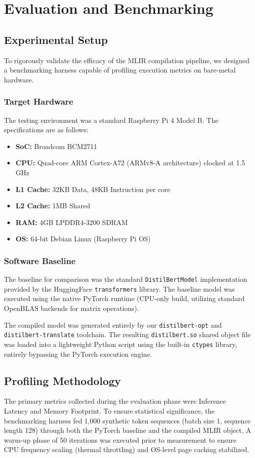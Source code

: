 \chapter{Evaluation and Benchmarking}
\label{ch:evaluation}

\section{Experimental Setup}
To rigorously validate the efficacy of the MLIR compilation pipeline, we designed a benchmarking harness capable of profiling execution metrics on bare-metal hardware. 

\subsection{Target Hardware}
The testing environment was a standard Raspberry Pi 4 Model B. The specifications are as follows:
\begin{itemize}
    \item \textbf{SoC:} Broadcom BCM2711
    \item \textbf{CPU:} Quad-core ARM Cortex-A72 (ARMv8-A architecture) clocked at 1.5 GHz
    \item \textbf{L1 Cache:} 32KB Data, 48KB Instruction per core
    \item \textbf{L2 Cache:} 1MB Shared
    \item \textbf{RAM:} 4GB LPDDR4-3200 SDRAM
    \item \textbf{OS:} 64-bit Debian Linux (Raspberry Pi OS)
\end{itemize}

\subsection{Software Baseline}
The baseline for comparison was the standard \texttt{DistilBertModel} implementation provided by the HuggingFace \texttt{transformers} library. The baseline model was executed using the native PyTorch runtime (CPU-only build, utilizing standard OpenBLAS backends for matrix operations). 

The compiled model was generated entirely by our \texttt{distilbert-opt} and \texttt{distilbert-translate} toolchain. The resulting \texttt{distilbert.so} shared object file was loaded into a lightweight Python script using the built-in \texttt{ctypes} library, entirely bypassing the PyTorch execution engine.

\section{Profiling Methodology}
The primary metrics collected during the evaluation phase were Inference Latency and Memory Footprint. To ensure statistical significance, the benchmarking harness fed 1,000 synthetic token sequences (batch size 1, sequence length 128) through both the PyTorch baseline and the compiled MLIR object. A warm-up phase of 50 iterations was executed prior to measurement to ensure CPU frequency scaling (thermal throttling) and OS-level page caching stabilized.

